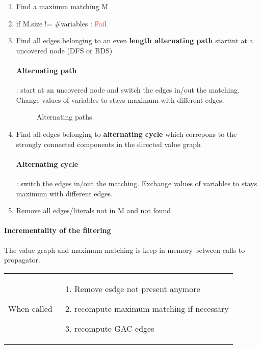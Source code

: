 \begin{enumerate}
    \item Find a maximun matching M
    \item if M.size != \#variables : \textcolor{red}{Fail}

    \item Find all edges belonging to an even \textbf{length alternating
        path} startint at a uncovered node (DFS or BDS)

        \paragraph{Alternating path}: start at an uncovered node and
        switch the edges in/out the matching. Change values
        of variables to stays maximum with different edges.

        \begin{figure}[!h]
            \centering
            \caption{Alternating paths}
        \end{figure}

    \item Find all edges belonging to \textbf{alternating cycle} which
        correpons to the strongly connected components in the directed value
        graph

        \paragraph{Alternating cycle}: switch the edges in/out the matching.
        Exchange values of variables to stays maximum with different edges.

    \item Remove all edges/literals not in M and not found
\end{enumerate}

\paragraph{Incrementality of the filtering}
The value graph and maximum matching is keep in memory between calls to propagator.

\begin{tabular}{cm{12cm}}
When called
&
\begin{enumerate}
    \item Remove esdge not present anymore
    \item recompute maximum matching if necessary
    \item recompute GAC edges
\end{enumerate}
\end{tabular}

